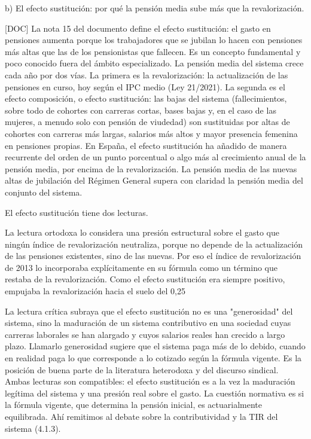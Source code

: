\documentclass[10pt,a4paper]{article}
\begin{document}
b) El efecto sustitución: por qué la pensión media sube más que la revalorización.

[DOC] La nota 15 del documento define el efecto sustitución: el gasto en pensiones aumenta porque los trabajadores que se jubilan lo hacen con pensiones más altas que las de los pensionistas que fallecen. Es un concepto fundamental y poco conocido fuera del ámbito especializado. La pensión media del sistema crece cada año por dos vías. La primera es la revalorización: la actualización de las pensiones en curso, hoy según el IPC medio (Ley 21/2021). La segunda es el efecto composición, o efecto sustitución: las bajas del sistema (fallecimientos, sobre todo de cohortes con carreras cortas, bases bajas y, en el caso de las mujeres, a menudo solo con pensión de viudedad) son sustituidas por altas de cohortes con carreras más largas, salarios más altos y mayor presencia femenina en pensiones propias. En España, el efecto sustitución ha añadido de manera recurrente del orden de un punto porcentual o algo más al crecimiento anual de la pensión media, por encima de la revalorización. La pensión media de las nuevas altas de jubilación del Régimen General supera con claridad la pensión media del conjunto del sistema.

El efecto sustitución tiene dos lecturas.

La lectura ortodoxa lo considera una presión estructural sobre el gasto que ningún índice de revalorización neutraliza, porque no depende de la actualización de las pensiones existentes, sino de las nuevas. Por eso el índice de revalorización de 2013 lo incorporaba explícitamente en su fórmula como un término que restaba de la revalorización. Como el efecto sustitución era siempre positivo, empujaba la revalorización hacia el suelo del 0,25%

La lectura crítica subraya que el efecto sustitución no es una "generosidad" del sistema, sino la maduración de un sistema contributivo en una sociedad cuyas carreras laborales se han alargado y cuyos salarios reales han crecido a largo plazo. Llamarlo generosidad sugiere que el sistema paga más de lo debido, cuando en realidad paga lo que corresponde a lo cotizado según la fórmula vigente. Es la posición de buena parte de la literatura heterodoxa y del discurso sindical. Ambas lecturas son compatibles: el efecto sustitución es a la vez la maduración legítima del sistema y una presión real sobre el gasto. La cuestión normativa es si la fórmula vigente, que determina la pensión inicial, es actuarialmente equilibrada. Ahí remitimos al debate sobre la contributividad y la TIR del sistema (4.1.3).
\end{document}

